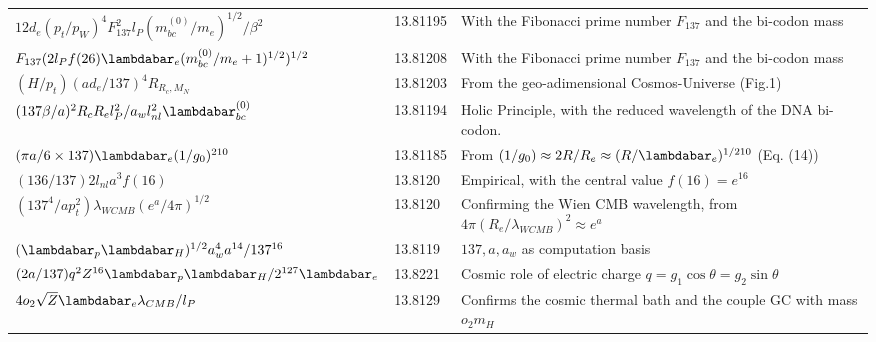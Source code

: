 \documentclass[a4paper,9pt]{article}
\begin{document}
\begin{table}
\begin{tabular}{lll}
  $12 d_e (p_t/p_W)^4 F_{137}^2 l_P(m_{bc}^{(0)}/m_e)^{1/2}/\beta^2$ & 13.81195    & With the Fibonacci prime number $F_{137}$ and the bi-codon mass\\
  
  $F_{137} (2 l_P f(26) \lambdabar_{e}(m_{bc}^{(0)}/m_e+1)^{1/2})^{1/2}$ & 13.81208    & With the Fibonacci prime number $F_{137}$ and the bi-codon mass\\
 
 
 
  $(H/p_t)(ad_e/137)^4 R_{R_c,M_N} $ & 13.81203    & From the geo-adimensional Cosmos-Universe (Fig.1)\\
  
  
 
 $(137\beta/a)^2R_cR_el_P^2/a_w l_{nl}^2\lambdabar_{bc}^{(0)}$ & 13.81194    &  Holic Principle, with the reduced wavelength of the DNA bi-codon. \\
  
 
 
$(\pi a/6\times 137) \lambdabar_e (1/g_0)^{210} $ & 13.81185 & From $(1/g_0) \approx 2R/R_e \approx (R/\lambdabar_e)^{1/210}$ (Eq. (14)) \\  
     
  
 $ (136/137)2l_{nl}a^3f(16)$  & 13.8120    & Empirical, with the central value $f(16) = e^{16}$ \\ 
 
  $ (137^4/ap_t^2)\lambda_{WCMB}(e^a/4\pi)^{1/2}$  & 13.8120    & Confirming the Wien CMB wavelength, from $4\pi (R_e/\lambda_{WCMB})^2 \approx e^{a}$ \\ 
 
 
  
  
 $(\lambdabar_{p} \lambdabar_{H})^{1/2} a_w^4 a^{14}/137^{16}$  & 13.8119    &  $137,a,a_w$ as computation basis \\
 
 
 
 
  $(2a/137)q^2 Z^{16} \lambdabar_{p} \lambdabar_{H}/2^{127}\lambdabar_{e} $  & 13.8221    & Cosmic role of electric charge $q = g_1 \cos \theta = g_2 \sin \theta$  \\
 
 
 
 
 
 $4o_2\sqrt Z \lambdabar_{e}\lambda_{CMB}/l_P     $  & 13.8129    &Confirms the cosmic thermal bath and the couple GC with mass $o_2 m_H$    \\
 

\end{tabular}
\end{table}
\end{document}
